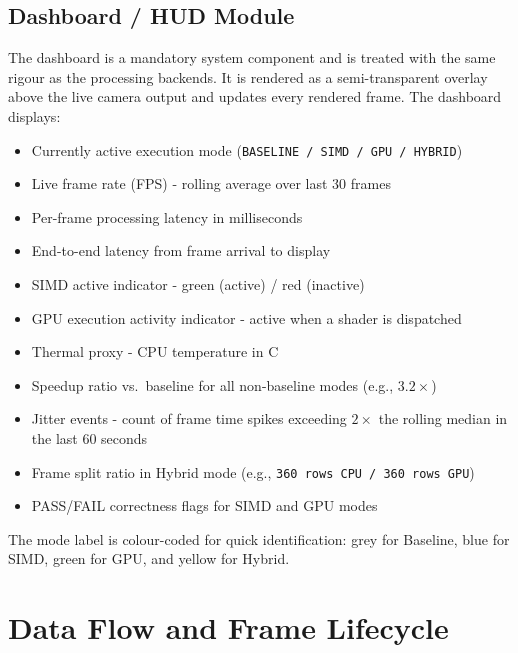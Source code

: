 \documentclass[12pt, a4paper]{article}
\begin{document}
\subsection{Dashboard / HUD Module}
The dashboard is a mandatory system component and is treated with the same rigour as the
processing backends. It is rendered as a semi-transparent overlay above the live camera output
and updates every rendered frame. The dashboard displays:
\begin{itemize}
    \item Currently active execution mode (\texttt{BASELINE / SIMD / GPU / HYBRID})
    \item Live frame rate (FPS) - rolling average over last 30 frames
    \item Per-frame processing latency in milliseconds
    \item End-to-end latency from frame arrival to display
    \item SIMD active indicator - green (active) / red (inactive)
    \item GPU execution activity indicator - active when a shader is dispatched
    \item Thermal proxy - CPU temperature in \textdegree C
    \item Speedup ratio vs.\ baseline for all non-baseline modes (e.g., $3.2\times$)
    \item Jitter events - count of frame time spikes exceeding $2\times$ the rolling median
          in the last 60 seconds
    \item Frame split ratio in Hybrid mode (e.g., \texttt{360 rows CPU / 360 rows GPU})
    \item PASS/FAIL correctness flags for SIMD and GPU modes
\end{itemize}

The mode label is colour-coded for quick identification: grey for Baseline, blue for SIMD,
green for GPU, and yellow for Hybrid.

\section{Data Flow and Frame Lifecycle}
\end{document}

